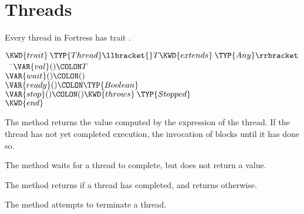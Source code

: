 %
%
%
%

\chapter{Threads}


Every thread in Fortress has trait .

\begin{Fortress}
\(\KWD{trait}\mskip 4mu plus 4mu\TYP{Thread}\llbracket{}T \KWD{extends}\mskip 4mu plus 4mu\TYP{Any}\rrbracket\)\\
{\tt~~}\pushtabs\=\+\(  \VAR{val}()\COLON T\)\\
\(  \VAR{wait}()\COLON ()\)\\
\(  \VAR{ready}()\COLON \TYP{Boolean}\)\\
\(  \VAR{stop}()\COLON () \KWD{throws}\mskip 4mu plus 4mu\TYP{Stopped}\)\-\\\poptabs
\(\KWD{end}\)
\end{Fortress}


The  method returns the value computed by the expression of the
thread.  If the thread has not yet completed execution, the invocation of
 blocks until it has done so.


The  method waits for a thread to complete, but does not return a
value. 


The  method returns  if a thread has completed, and
returns  otherwise.


The  method attempts to terminate a thread.
